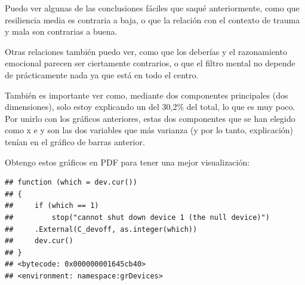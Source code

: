 \documentclass[]{article}
\newenvironment{Shaded}{\begin{snugshade}}{\end{snugshade}}
\newcommand{\CommentTok}[1]{\textcolor[rgb]{0.56,0.35,0.01}{\textit{#1}}}
\newcommand{\DataTypeTok}[1]{\textcolor[rgb]{0.13,0.29,0.53}{#1}}
\newcommand{\DecValTok}[1]{\textcolor[rgb]{0.00,0.00,0.81}{#1}}
\newcommand{\KeywordTok}[1]{\textcolor[rgb]{0.13,0.29,0.53}{\textbf{#1}}}
\newcommand{\NormalTok}[1]{#1}
\newcommand{\OperatorTok}[1]{\textcolor[rgb]{0.81,0.36,0.00}{\textbf{#1}}}
\newcommand{\OtherTok}[1]{\textcolor[rgb]{0.56,0.35,0.01}{#1}}
\newcommand{\StringTok}[1]{\textcolor[rgb]{0.31,0.60,0.02}{#1}}
\begin{document}
Puedo ver algunas de las conclusiones fáciles que saqué anteriormente,
como que resiliencia media es contraria a baja, o que la relación con el
contexto de trauma y mala son contrarias a buena.

Otras relaciones también puedo ver, como que los deberías y el
razonamiento emocional parecen ser ciertamente contrarios, o que el
filtro mental no depende de prácticamente nada ya que está en todo el
centro.

También es importante ver como, mediante dos componentes principales
(dos dimensiones), solo estoy explicando un del 30,2\% del total, lo que
es muy poco. Por unirlo con los gráficos anteriores, estas dos
componentes que se han elegido como x e y son las dos variables que más
varianza (y por lo tanto, explicación) tenían en el gráfico de barras
anterior.

Obtengo estos gráficos en PDF para tener una mejor visualización:

\begin{Shaded}
\end{Shaded}

\begin{verbatim}
## function (which = dev.cur()) 
## {
##     if (which == 1) 
##         stop("cannot shut down device 1 (the null device)")
##     .External(C_devoff, as.integer(which))
##     dev.cur()
## }
## <bytecode: 0x000000001645cb40>
## <environment: namespace:grDevices>
\end{verbatim}
\end{document}
